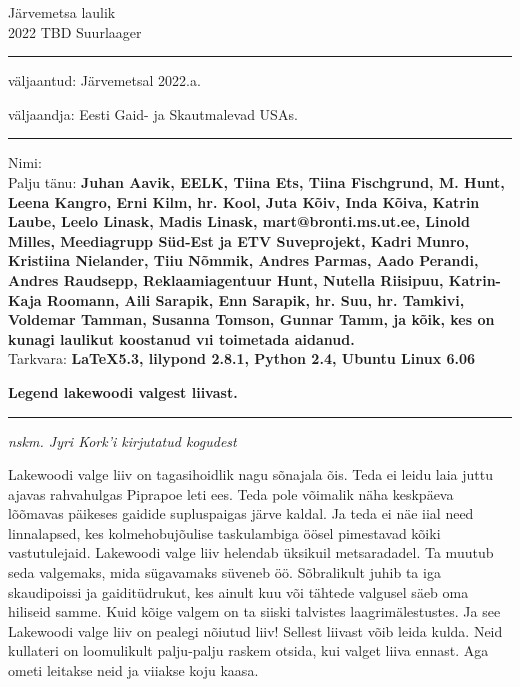 \documentclass[12pt]{extbook}
\begin{document}
\rmfamily

\begin{titlepage}
  \null
  \begin{center}
    \vspace{1.5in}
    {\LARGE Järvemetsa laulik }\\
    { 2022 TBD Suurlaager }
    \vfill
  \end{center}
\end{titlepage}

\null
\vspace{0.5in}
\hrule height 0.05ex
\vspace{.1in}
\centerline{\footnotesize v\"aljaantud: J\"arvemetsal 2022.a.}
\centerline{\footnotesize v\"aljaandja: Eesti Gaid- ja Skautmalevad USAs.    }
\vspace{.1in}
\hrule height 0.05ex
\vspace{.25in}
Nimi:\dotfill
\vfill
{}\\
{\footnotesize Palju t\"anu: \bf{Juhan Aavik, EELK, Tiina Ets, Tiina Fischgrund, M. Hunt, Leena Kangro, Erni Kilm, hr. Kool, Juta K\~oiv, Inda K\~oiva, Katrin Laube, Leelo Linask, Madis Linask, mart@bronti.ms.ut.ee, Linold Milles, Meediagrupp S\"ud-Est ja ETV Suveprojekt, Kadri Munro, Kristiina Nielander, Tiiu N\~ommik, Andres Parmas, Aado Perandi, Andres Raudsepp, Reklaamiagentuur Hunt, Nutella Riisipuu, Katrin-Kaja Roomann, Aili Sarapik, Enn Sarapik, hr. Suu, hr. Tamkivi, Voldemar Tamman, Susanna Tomson, Gunnar Tamm, ja k\~oik, kes on kunagi laulikut koostanud vıi toimetada aidanud. }}\\
{\footnotesize Tarkvara: \bf{\LaTeX 5.3, lilypond 2.8.1, Python 2.4, Ubuntu Linux 6.06}}
\clearpage
\null
\vspace{2in}
\cleardoublepage
{\samepage\raggedbottom
\raggedright
\sloppy
\centerline{ {\bf {\large Legend lakewoodi valgest liivast.}}}
\vspace{0.1in}
\hrule height 0.05ex
\vspace{0.1in}
\centerline{ {\em {\footnotesize nskm. Jyri Kork'i kirjutatud kogudest}}}}
\vspace{.05in}

Lakewoodi valge liiv on tagasihoidlik nagu s\~onajala \~ois.  Teda ei leidu laia juttu ajavas rahvahulgas Piprapoe leti ees.  Teda pole v\~oimalik n\"aha keskp\"aeva l\~o\~omavas p\"aikeses gaidide supluspaigas j\"arve kaldal.  Ja teda ei n\"ae iial need linnalapsed, kes kolmehobuj\~oulise taskulambiga \"o\"osel pimestavad k\~oiki vastutulejaid.  Lakewoodi valge liiv helendab \"uksikuil metsaradadel.  Ta muutub seda valgemaks, mida s\"ugavamaks s\"uveneb \"o\"o.  S\~obralikult juhib ta iga skaudipoissi ja gaidit\"udrukut, kes ainult kuu v\~oi t\"ahtede valgusel s\"aeb oma hiliseid samme.  Kuid k\~oige valgem on ta siiski talvistes laagrim\"alestustes.  Ja see Lakewoodi valge liiv on pealegi n\~oiutud liiv!  Sellest liivast v\~oib leida kulda.  Neid kullateri on loomulikult palju-palju raskem otsida, kui valget liiva ennast.  Aga ometi leitakse neid ja viiakse koju kaasa.
\end{document}
